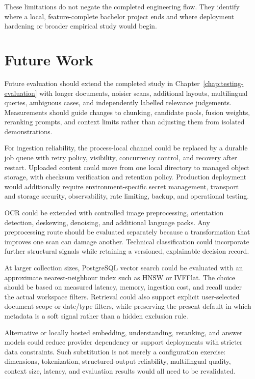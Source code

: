 These limitations do not negate the completed engineering flow. They identify where a local, feature-complete bachelor project ends and where deployment hardening or broader empirical study would begin.

\section{Future Work}

Future evaluation should extend the completed study in Chapter~\ref{chap:testing-evaluation} with longer documents, noisier scans, additional layouts, multilingual queries, ambiguous cases, and independently labelled relevance judgements. Measurements should guide changes to chunking, candidate pools, fusion weights, reranking prompts, and context limits rather than adjusting them from isolated demonstrations.

For ingestion reliability, the process-local channel could be replaced by a durable job queue with retry policy, visibility, concurrency control, and recovery after restart. Uploaded content could move from one local directory to managed object storage, with checksum verification and retention policy. Production deployment would additionally require environment-specific secret management, transport and storage security, observability, rate limiting, backup, and operational testing.

OCR could be extended with controlled image preprocessing, orientation detection, deskewing, denoising, and additional language packs. Any preprocessing route should be evaluated separately because a transformation that improves one scan can damage another. Technical classification could incorporate further structural signals while retaining a versioned, explainable decision record.

At larger collection sizes, PostgreSQL vector search could be evaluated with an approximate nearest-neighbour index such as HNSW or IVFFlat. The choice should be based on measured latency, memory, ingestion cost, and recall under the actual workspace filters. Retrieval could also support explicit user-selected document scope or date/type filters, while preserving the present default in which metadata is a soft signal rather than a hidden exclusion rule.

Alternative or locally hosted embedding, understanding, reranking, and answer models could reduce provider dependency or support deployments with stricter data constraints. Such substitution is not merely a configuration exercise: dimensions, tokenization, structured-output reliability, multilingual quality, context size, latency, and evaluation results would all need to be revalidated.

